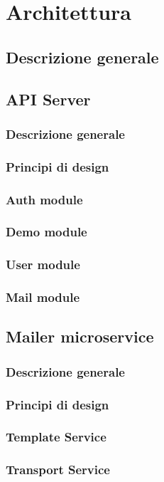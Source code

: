 \chapter{Architettura}
\section{Descrizione generale}
\kant[5]
\section{API Server}
\subsection{Descrizione generale}
\kant[5]
\subsection{Principi di design}
\kant[5]
\subsection{Auth module}
\kant[5]
\subsection{Demo module}
\kant[5]
\subsection{User module}
\kant[5]
\subsection{Mail module}
\kant[5]

\section{Mailer microservice}
\subsection{Descrizione generale}
\kant[5]
\subsection{Principi di design}
\kant[5]
\subsection{Template Service}
\kant[5]
\subsection{Transport Service}
\kant[5]


